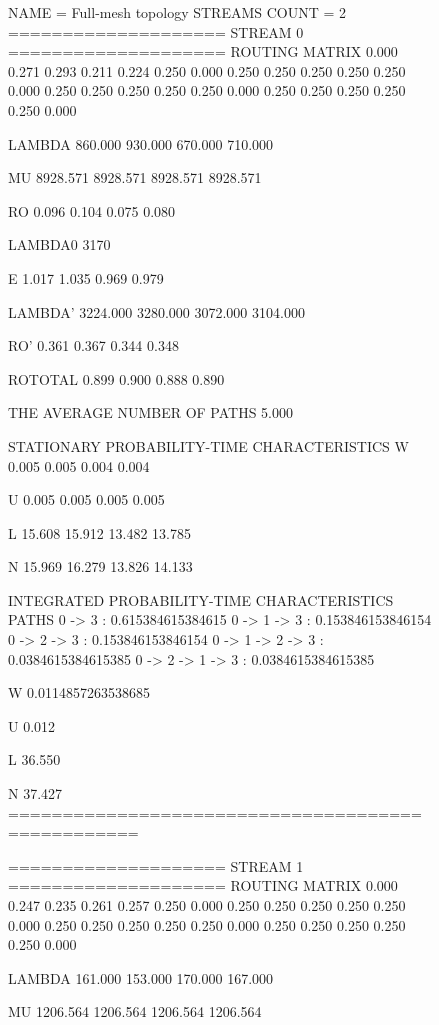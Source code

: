 \documentclass[oneside, draft, 14pt, a4paper]{extreport}
\begin{document}
\begin{figure}[h!]
	\begin{listing}{1}
NAME = Full-mesh topology
STREAMS COUNT = 2
==================== STREAM 0 ====================
ROUTING MATRIX
0.000	0.271	0.293	0.211	0.224
0.250	0.000	0.250	0.250	0.250
0.250	0.250	0.000	0.250	0.250
0.250	0.250	0.250	0.000	0.250
0.250	0.250	0.250	0.250	0.000

LAMBDA
860.000
930.000
670.000
710.000

MU
8928.571
8928.571
8928.571
8928.571

RO
0.096
0.104
0.075
0.080

LAMBDA0
3170

E
1.017
1.035
0.969
0.979

LAMBDA'
3224.000
3280.000
3072.000
3104.000\end{listing}

	\label{pic:demo4_log_begin}
\end{figure}

\begin{figure}[h!]
	\begin{listing}{37}
RO'
0.361
0.367
0.344
0.348

ROTOTAL
0.899
0.900
0.888
0.890

THE AVERAGE NUMBER OF PATHS
5.000

STATIONARY PROBABILITY-TIME CHARACTERISTICS
W
0.005
0.005
0.004
0.004

U
0.005
0.005
0.005
0.005

L
15.608
15.912
13.482
13.785

N
15.969
16.279
13.826
14.133\end{listing}
\end{figure}

\begin{figure}[h!]
	\begin{listing}{73}
INTEGRATED PROBABILITY-TIME CHARACTERISTICS
PATHS
0 -> 3 : 0.615384615384615
0 -> 1 -> 3 : 0.153846153846154
0 -> 2 -> 3 : 0.153846153846154
0 -> 1 -> 2 -> 3 : 0.0384615384615385
0 -> 2 -> 1 -> 3 : 0.0384615384615385

W
0.0114857263538685

U
0.012

L
36.550

N
37.427
==================================================

==================== STREAM 1 ====================
ROUTING MATRIX
0.000	0.247	0.235	0.261	0.257
0.250	0.000	0.250	0.250	0.250
0.250	0.250	0.000	0.250	0.250
0.250	0.250	0.250	0.000	0.250
0.250	0.250	0.250	0.250	0.000

LAMBDA
161.000
153.000
170.000
167.000

MU
1206.564
1206.564
1206.564
1206.564\end{listing}
\end{figure}
\end{document}
